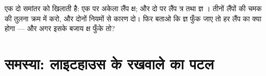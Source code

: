 \begin{exercise}[$\star\star\star$]\label{exo:g7:circuits-series-parallel:12}
एक  दो समांतर  को खिलाती है:  एक पर अकेला लैंप क्ष; और
 दो पर लैंप त्र तथा ज्ञ । तीनों लैंपों की चमक की तुलना
क्रम में करो, और दोनों नियमों से कारण दो। फिर बताओ कि ज्ञ फुँक जाए तो
हर लैंप का क्या होगा --- और अगर इसके बजाय क्ष फुँके तो?
\end{exercise}

\section{समस्या: लाइटहाउस के रखवाले का पटल}

